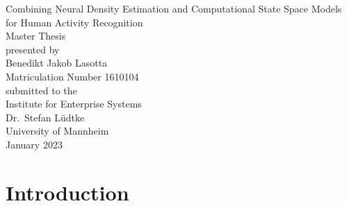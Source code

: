 \documentclass[11pt,titlepage,oneside,openany]{book}
\begin{document}
\begin{titlepage}
	\vspace*{2cm}
  \begin{center}
   {\Large Combining Neural Density Estimation and Computational State Space Models for Human Activity Recognition\\}
   \vspace{2cm} 
   {Master Thesis\\}
   \vspace{2cm}
   {presented by\\
    Benedikt Jakob Lasotta \\
    Matriculation Number 1610104\\
   }
   \vspace{1cm} 
   {submitted to the\\
    Institute for Enterprise Systems\\
    Dr.\ Stefan L\"udtke\\
    University of Mannheim\\} \vspace{2cm}
   {January 2023}
  \end{center}
\end{titlepage} 

\tableofcontents
\newpage


\listoffigures

\listoftables


\newpage



\chapter{Introduction}
\label{cha:intro}

\end{document}
